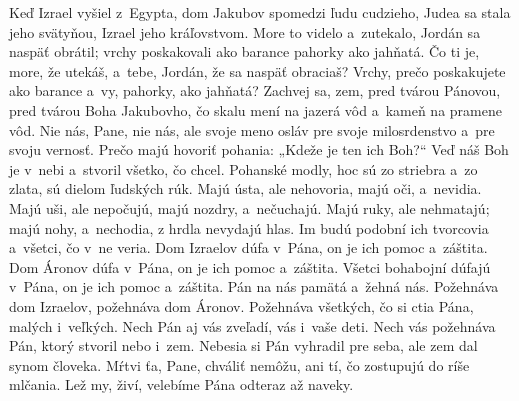 Keď Izrael vyšiel z~Egypta,
dom Jakubov spomedzi ľudu cudzieho,
\versseparator
Judea sa stala jeho svätyňou,
Izrael jeho kráľovstvom.
\versseparator
More to videlo a~zutekalo,
Jordán sa naspäť obrátil;
\versseparator
vrchy poskakovali ako barance
pahorky ako jahňatá.
\versseparator
Čo ti je, more, že utekáš,
a~tebe, Jordán, že sa naspäť obraciaš?
\versseparator
Vrchy, prečo poskakujete ako barance
a~vy, pahorky, ako jahňatá?
\versseparator
Zachvej sa, zem, pred tvárou Pánovou,
pred tvárou Boha Jakubovho,
\versseparator
čo skalu mení na jazerá vôd
a~kameň na pramene vôd.
\versseparator
Nie nás, Pane, nie nás,
ale svoje meno osláv
\versseparator
pre svoje milosrdenstvo a~pre svoju vernosť.
Prečo majú hovoriť pohania:
„Kdeže je ten ich Boh?“
\versseparator
Veď náš Boh je v~nebi
a~stvoril všetko, čo chcel.
\versseparator
Pohanské modly, hoc sú zo striebra a~zo zlata,
sú dielom ľudských rúk.
\versseparator
Majú ústa, ale nehovoria,
majú oči, a~nevidia.
\versseparator
Majú uši, ale nepočujú,
majú nozdry, a~nečuchajú.
\versseparator
Majú ruky, ale nehmatajú;
majú nohy, a~nechodia,
z hrdla nevydajú hlas.
\versseparator
Im budú podobní ich tvorcovia
a~všetci, čo v~ne veria.
\versseparator
Dom Izraelov dúfa v~Pána,
on je ich pomoc a~záštita.
\versseparator
Dom Áronov dúfa v~Pána,
on je ich pomoc a~záštita.
\versseparator
Všetci bohabojní dúfajú v~Pána,
on je ich pomoc a~záštita.
\versseparator
Pán na nás pamätá
a~žehná nás.
\versseparator
Požehnáva dom Izraelov,
požehnáva dom Áronov.
\versseparator
Požehnáva všetkých, čo si ctia Pána,
malých i~veľkých.
\versseparator
Nech Pán aj vás zveľadí,
vás i~vaše deti.
\versseparator
Nech vás požehnáva Pán,
ktorý stvoril nebo i~zem.
\versseparator
Nebesia si Pán vyhradil pre seba,
ale zem dal synom človeka.
\versseparator
Mŕtvi ťa, Pane, chváliť nemôžu,
ani tí, čo zostupujú do ríše mlčania.
\versseparator
Lež my, živí, velebíme Pána
odteraz až naveky.